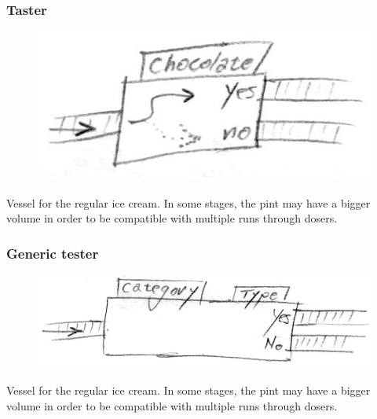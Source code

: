\documentclass[a4paper]{scrartcl}
\begin{document}
        \subsubsection{Taster}
            \begin{minipage}[t][3em][t]{\textwidth}
                \begin{figure}
                    \vspace{-20pt}
                    \includegraphics[scale=1]{devices/taster}
                    \vspace{-20pt}
                \end{figure}

                Vessel for the regular ice cream. In some stages, the pint may have
                a bigger volume in order to be compatible with multiple runs through
                dosers.
            \end{minipage}

        \subsubsection{Generic tester}
            \begin{minipage}[t][4em][t]{\textwidth}
                \begin{figure}
                    \vspace{-20pt}
                    \includegraphics[scale=1]{devices/generic_conditional}
                    \vspace{-20pt}
                \end{figure}

                Vessel for the regular ice cream. In some stages, the pint may have
                a bigger volume in order to be compatible with multiple runs through
                dosers.
            \end{minipage}
\end{document}
